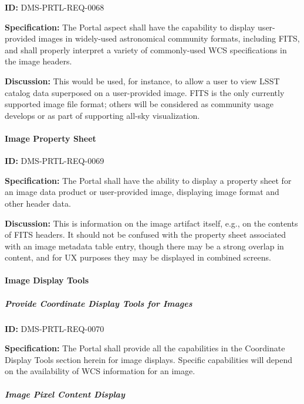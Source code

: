 \documentclass[SE,toc]{lsstdoc}
\begin{document}
\label{DMS-PRTL-REQ-0068}
\textbf{ID:} DMS-PRTL-REQ-0068

\textbf{Specification:}
The Portal aspect shall have the capability to display user-provided images in widely-used astronomical community formats, including FITS, and shall properly interpret a variety of commonly-used WCS specifications in the image headers.

\textbf{Discussion:}
This would be used, for instance, to allow a user to view LSST catalog data superposed on a user-provided image.  FITS is the only currently supported image file format; others will be considered as community usage develops or as part of supporting all-sky visualization.

\paragraph{Image Property Sheet}\hfill  %

\label{DMS-PRTL-REQ-0069}
\textbf{ID:} DMS-PRTL-REQ-0069

\textbf{Specification:}
The Portal shall have the ability to display a property sheet for an image data product or user-provided image, displaying image format and other header data.

\textbf{Discussion:}
This is information on the image artifact itself, e.g., on the contents of FITS headers.  It should not be confused with the property sheet associated with an image metadata table entry, though there may be a strong overlap in content, and for UX purposes they may be displayed in combined screens.

\paragraph{Image Display Tools}\hfill  %

\subparagraph{Provide Coordinate Display Tools for Images}\hfill  %

\label{DMS-PRTL-REQ-0070}
\textbf{ID:} DMS-PRTL-REQ-0070

\textbf{Specification:}
The Portal shall provide all the capabilities in the Coordinate Display Tools section herein for image displays.  Specific capabilities will depend on the availability of WCS information for an image.

\subparagraph{Image Pixel Content Display}\hfill  %
\end{document}
